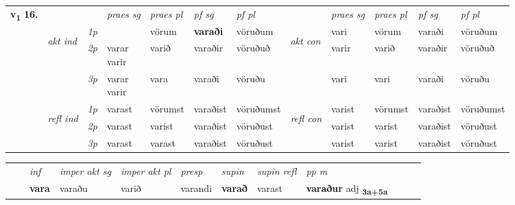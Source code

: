 \begin{tabular}{llllllllllll} \toprule
\multirow{4}{*}{{{\textbf{v{\textsubscript{1}}} \Large{\textbf{16.}}}}}  & &   &  \textit{praes sg}  & \textit{praes pl}  &\textit{ pf sg} & \textit{pf pl} &  &  \textit{praes sg}  & \textit{praes pl}  & \textit{pf sg} & \textit{pf pl } \\*
	\cmidrule{4-7} \cmidrule{9-12}
 & \multirow{3}{*}{\begin{turn}{90}\textit{akt ind}\end{turn}} & {\textit{1p}} & \textbf{\specialcell{vara\\ vari}} & vörum    & \textbf{varaði} & vöruðum & \multirow{3}{*}{\begin{turn}{90}\textit{akt con}\end{turn}} &vari & vörum & varaði & vöruðum\\*
& &  {\textit{2p}} &  \specialcell{varar\\ varir}  & varið   & varaðir & vöruðuð & & varir & varið & varaðir & vöruðuð \\*
& &  {\textit{3p}} & \specialcell{varar\\ varir} & vara   & varaði & vöruðu & & vari & vari& varaði & vöruðu  \\*
\cmidrule{4-7} \cmidrule{9-12}
 &\multirow{3}{*}{\begin{turn}{90}\textit{refl ind}\end{turn}} & {\textit{1p}} & varast & vörumst    & varaðist & vöruðumst & \multirow{3}{*}{\begin{turn}{90}\textit{refl con}\end{turn}}  &varist & vörumst & varaðist & vöruðumst\\*
 &&  {\textit{2p}} &  varast  & varist   & varaðist & vöruðust & &varist & varist & varaðist & vöruðust \\*
& &  {\textit{3p}} & varast & varast   & varaðist & vöruðust & & varist & varist& varaðist & vöruðust  \\*
\cmidrule{4-7} \cmidrule{9-12}
\end{tabular}


\begin{tabular}{llllllllllll}
 & & \textit{inf} & \textit{imper akt sg} & \textit{imper akt pl}   & \textit{presp} & \textit{supin} & \textit{supin refl} & \textit{pp m}     \\*
  & & \textbf{vara} & varaðu  & varið   & varandi &  \textbf{varað} & varast & \textbf{varaður} adj \textbf{\textsubscript{3a+5a}} \\*
\cmidrule{1-12}
\end{tabular}



